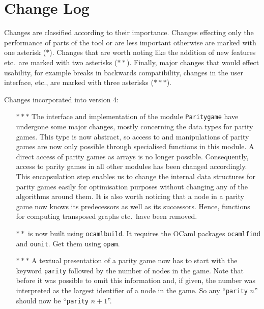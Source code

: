 \section{Change Log}

Changes are classified according to their importance. Changes effecting only the performance of
parts of the tool or are less important otherwise are marked with one asterisk ($\ast$). Changes
that are worth noting like the addition of new features etc.\ are marked with two asterisks 
($\ast\ast$). Finally, major changes that would effect usability, for example breaks in backwards
compatibility, changes in the user interface, etc., are marked with three asterisks ($\ast\ast\ast$).

Changes incorporated into version 4:
\begin{itemize}
\item[$\ast\ast\ast$] The interface and implementation of the module \texttt{Paritygame} have undergone some major changes,
     mostly concerning the data types for parity games. This type is now abstract, so access to and manipulations of parity games
     are now only possible through specialised functions in this module. A direct access of parity games as arrays is no longer
     possible. Consequently, access to parity games in all other modules has been changed accordingly. This encapsulation step 
     enables us to change the internal data structures for parity games easily for optimisation purposes without changing any of 
     the algorithms around them. It is also worth noticing that a node in a parity game now knows its predecessors as well as its
     successors. Hence, functions for computing transposed graphs etc.\ have been removed.
\item[$\ast\ast$] \pgsolver is now built using \texttt{ocamlbuild}. It requires the OCaml packages \texttt{ocamlfind} and \texttt{ounit}.
     Get them using \texttt{opam}.
\item[$\ast\ast\ast$] A textual presentation of a parity game now has to start with the keyword \texttt{parity} followed by the number of
     nodes in the game. Note that before it was possible to omit this information and, if given, the number was interpreted as the largest
     identifier of a node in the game. So any ``\texttt{parity} $n$'' should now be ``\texttt{parity} $n+1$''. 
\end{itemize}

